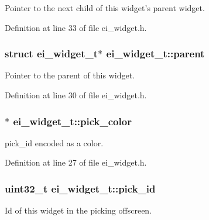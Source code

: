 Pointer to the next child of this widget's parent widget. 



Definition at line 33 of file ei\+\_\+widget.\+h.

\hypertarget{structei__widget__t_adb1b43eda89c8e86d6337c939f1a4473}{
\subsubsection[{parent}]{\setlength{\rightskip}{0pt plus 5cm}struct {\bf ei\+\_\+widget\+\_\+t}$\ast$ ei\+\_\+widget\+\_\+t\+::parent}}\label{structei__widget__t_adb1b43eda89c8e86d6337c939f1a4473}


Pointer to the parent of this widget. 



Definition at line 30 of file ei\+\_\+widget.\+h.

\hypertarget{structei__widget__t_ad1477adf8e6b5cb6a5f11f657fe4781b}{
\subsubsection[{pick\+\_\+color}]{$\ast$ ei\+\_\+widget\+\_\+t\+::pick\+\_\+color}}\label{structei__widget__t_ad1477adf8e6b5cb6a5f11f657fe4781b}


pick\+\_\+id encoded as a color. 



Definition at line 27 of file ei\+\_\+widget.\+h.

\hypertarget{structei__widget__t_ada7ce878377d653d930a57e175b61182}{
\subsubsection[{pick\+\_\+id}]{\setlength{\rightskip}{0pt plus 5cm}uint32\+\_\+t ei\+\_\+widget\+\_\+t\+::pick\+\_\+id}}\label{structei__widget__t_ada7ce878377d653d930a57e175b61182}


Id of this widget in the picking offscreen. 



